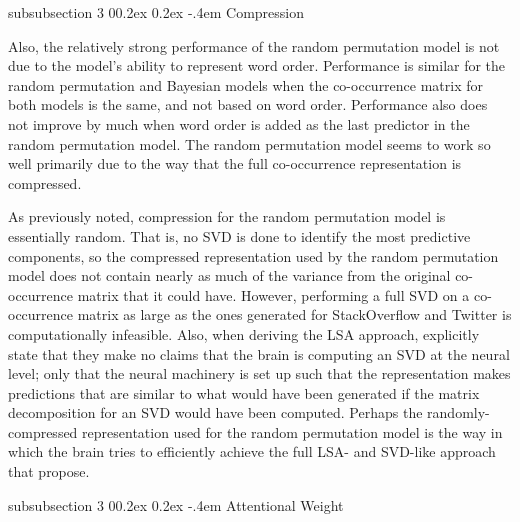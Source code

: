 \documentclass[man,floatsintext,donotrepeattitle]{apa6}
\makeatletter
\renewcommand{\subsubsection}{%
  \@startsection
  {subsubsection}%
  {3}%
  {\parindent}%
  {0\baselineskip \@plus 0.2ex \@minus 0.2ex}%
  {-.4em}%
  {\normalfont\normalsize\bfseries\addperi}}
\makeatother
\begin{document}
\subsubsection{Compression}

Also, the relatively strong performance of the random permutation model is not due to the model's ability to represent word order.
Performance is similar for the random permutation and Bayesian models when the co-occurrence matrix for both models is the same, and not based on word order.
Performance also does not improve by much when word order is added as the last predictor in the random permutation model.
The random permutation model seems to work so well primarily due to the way that the full co-occurrence representation is compressed.

As previously noted, compression for the random permutation model is essentially random.
That is, no SVD is done to identify the most predictive components,
so the compressed representation used by the random permutation model does not contain nearly as much of the variance from the original co-occurrence matrix that it could have.
However, performing a full SVD on a co-occurrence matrix as large as the ones generated for StackOverflow and Twitter is computationally infeasible.
Also, when deriving the LSA approach, \textcite{Landauer1997} explicitly state that they make no claims that the brain is computing an SVD at the neural level;
only that the neural machinery is set up such that the representation makes predictions that are similar to what would have been generated if the matrix decomposition for an SVD would have been computed.
Perhaps the randomly-compressed representation used for the random permutation model is the way in which the brain tries to efficiently achieve the full LSA- and SVD-like approach that \citeauthor{Landauer1997} propose.

\subsubsection{Attentional Weight}
\end{document}
